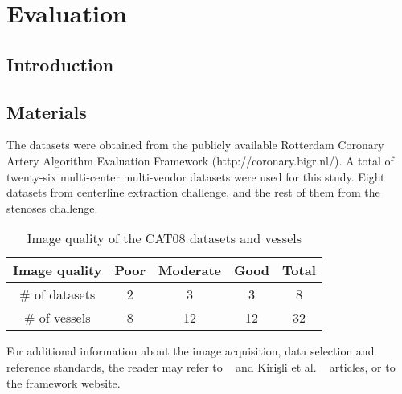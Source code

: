 \chapter{Evaluation}\label{eval:eval}

\section{Introduction}



\section{Materials}\label{eval:Materials}
 
The datasets were obtained from the publicly available Rotterdam Coronary Artery Algorithm Evaluation Framework (http://coronary.bigr.nl/). A total of twenty-six multi-center multi-vendor datasets were used for this study. Eight datasets from centerline extraction challenge, and the rest of them from the stenoses challenge. 
\begin{table*}
\scriptsize
\caption{Image quality of the CAT08 datasets and vessels}
\centering
\begin{tabular}{|c|c|c|c|c|}
\hline
\multicolumn{1}{|c|}{Image quality} &\multicolumn{1}{c|}{\textbf{Poor}} &\multicolumn{1}{c|}{\textbf{Moderate}} &\multicolumn{1}{c|}{\textbf{Good}}&\multicolumn{1}{c|}{\textbf{Total}}\\
\hline
\# of datasets&2 &3&3 &8\\
\# of vessels&8 &12&12 &32\\
\hline
\end{tabular}
\vspace{-0.3cm}
\label{tb:tb_4_5}
\normalsize
\end{table*}



For additional information about the image acquisition, data selection and reference standards, the reader may refer to ~\citep{Schaap2009} and Kirişli et al. ~\citep{Kirisli2013} articles, or to the framework website.

